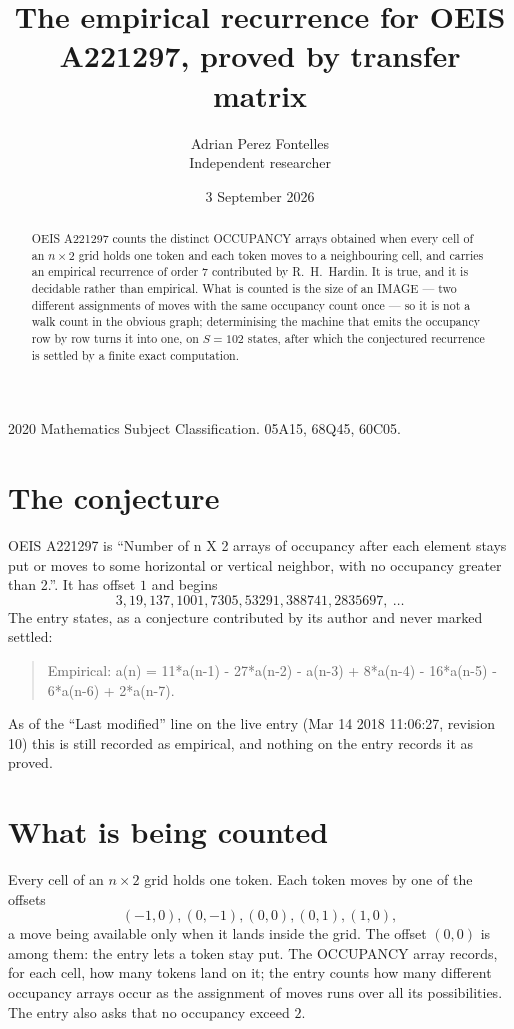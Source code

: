 \documentclass[11pt,a4paper]{article}
\title{The empirical recurrence for OEIS A221297, proved by transfer matrix}
\author{Adrian Perez Fontelles\\ \small Independent researcher}
\date{3 September 2026}
\theoremstyle{plain}
\theoremstyle{definition}
\begin{document}
\maketitle

\begin{abstract}
OEIS A221297 counts the distinct OCCUPANCY arrays obtained when every cell of an $n\times2$ grid
holds one token and each token moves to a neighbouring cell, and carries an empirical
recurrence of order $7$ contributed by R.~H.~Hardin. It is true, and it is decidable
rather than empirical. What is counted is the size of an IMAGE --- two different assignments of
moves with the same occupancy count once --- so it is not a walk count in the obvious graph;
determinising the machine that emits the occupancy row by row turns it into one, on $S=102$
states, after which the conjectured recurrence is settled by a finite exact computation.
\end{abstract}

\noindent\small 2020 Mathematics Subject Classification. 05A15, 68Q45, 60C05.\normalsize

\section{The conjecture}

OEIS A221297 is ``Number of n X 2 arrays of occupancy after each element stays put or moves to some horizontal or vertical neighbor, with no occupancy greater than 2.''. It has offset $1$ and begins
\[
3, 19, 137, 1001, 7305, 53291, 388741, 2835697,\ \dots
\]
The entry states, as a conjecture contributed by its author and never marked settled:
\begin{quote}
Empirical: a(n) = 11*a(n-1) - 27*a(n-2) - a(n-3) + 8*a(n-4) - 16*a(n-5) - 6*a(n-6) + 2*a(n-7).
\end{quote}
As of the ``Last modified'' line on the live entry (Mar 14 2018 11:06:27, revision 10) this is still
recorded as empirical, and nothing on the entry records it as proved.

\section{What is being counted}

Every cell of an $n\times2$ grid holds one token. Each token moves by one of the offsets
\[
(-1,0), (0,-1), (0,0), (0,1), (1,0),
\]
a move being available only when it lands inside the grid. The offset $(0,0)$ is among them: the entry lets a token stay put. The OCCUPANCY array
records, for each cell, how many tokens land on it; the entry counts how many different
occupancy arrays occur as the assignment of moves runs over all its possibilities. The entry also asks that no occupancy exceed $2$.
\end{document}
